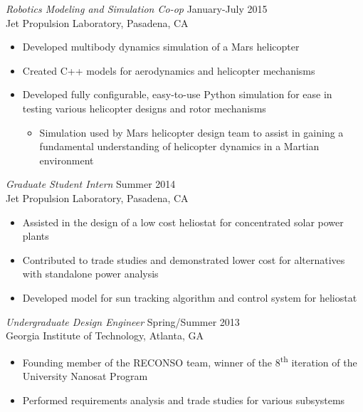 \documentclass[margin]{res} %
\begin{document}
\begin{resume}
{\sl Robotics Modeling and Simulation Co-op} \hfill January-July 2015 \\
Jet Propulsion Laboratory, Pasadena, CA

\begin{itemize} \itemsep -2pt %
\item Developed multibody dynamics simulation of a Mars helicopter
\item Created C++ models for aerodynamics and helicopter mechanisms
\item Developed fully configurable, easy-to-use Python simulation for ease in testing various helicopter designs and rotor mechanisms
\vspace{-2mm}
	\begin{itemize}
	\item Simulation used by Mars helicopter design team to assist in gaining a fundamental understanding of helicopter 	dynamics in a Martian environment
	\end{itemize}
\end{itemize}

{\sl Graduate Student Intern} \hfill Summer 2014 \\
Jet Propulsion Laboratory, Pasadena, CA
\begin{itemize} \itemsep -2pt %
\item Assisted in the design of a low cost heliostat for concentrated solar power plants
\item Contributed to trade studies and demonstrated lower cost for alternatives with standalone power analysis
\item Developed model for sun tracking algorithm and control system for heliostat
\end{itemize}

{\sl Undergraduate Design Engineer} \hfill Spring/Summer 2013 \\
Georgia Institute of Technology, Atlanta, GA
\begin{itemize} \itemsep -2pt %
\item Founding member of the RECONSO team, winner of the 8\textsuperscript{th} iteration of the University Nanosat Program
\item Performed requirements analysis and trade studies for various subsystems
\end{itemize}



\end{resume}
\end{document}
